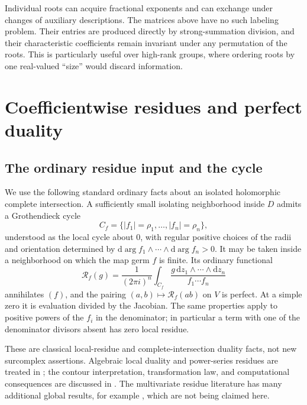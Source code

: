 \documentclass[11pt,letterpaper]{article}
\theoremstyle{definition}
\theoremstyle{remark}
\newcommand{\dif}{\mathrm d}
\numberwithin{equation}{section}
\begin{document}
Individual roots can acquire fractional exponents and can exchange under changes of auxiliary descriptions. The matrices above have no such labeling problem. Their entries are produced directly by strong-summation division, and their characteristic coefficients remain invariant under any permutation of the roots. This is particularly useful over high-rank groups, where ordering roots by one real-valued ``size'' would discard information.

\section{Coefficientwise residues and perfect duality}\label{sec:residue}

\subsection{The ordinary residue input and the cycle}
We use the following standard ordinary facts about an isolated holomorphic complete intersection. A sufficiently small isolating neighborhood inside $D$ admits a Grothendieck cycle
\[
 C_f=\{|f_1|=\rho_1,\ldots,|f_n|=\rho_n\},
\]
understood as the local cycle about $0$, with regular positive choices of the radii and orientation determined by
$\dif\arg f_1\wedge\cdots\wedge\dif\arg f_n>0$.
It may be taken inside a neighborhood on which the map germ $f$ is finite. Its ordinary functional
\begin{equation}\label{eq:ordinary-residue}
 \mathcal R_f(g)=\frac1{(2\pi i)^n}
 \int_{C_f}\frac{g\,\dif z_1\wedge\cdots\wedge\dif z_n}{f_1\cdots f_n}
\end{equation}
annihilates $(f)$, and the pairing $(a,b)\mapsto\mathcal R_f(ab)$ on $V$ is perfect. At a simple zero it is evaluation divided by the Jacobian. The same properties apply to positive powers of the $f_i$ in the denominator; in particular a term with one of the denominator divisors absent has zero local residue.

These are classical local-residue and complete-intersection duality facts, not new surcomplex assertions. Algebraic local duality and power-series residues are treated in \cite[Chapters 4--5, 8, and 10]{Kunz}; the contour interpretation, transformation law, and computational consequences are discussed in \cite[Section 1.5]{CattaniDickenstein}. The multivariate residue literature has many additional global results, for example \cite{CattaniDickensteinSturmfels}, which are not being claimed here.
\end{document}
